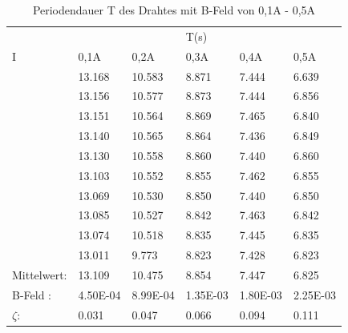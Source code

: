 \newpage
\begin{table}
    \centering
    \label{tab:tabelle_1}
    \begin{tabular}{p{3cm} | p{1.5cm} p{1.5cm} p{1.5cm} p{1.5cm} p{1.5cm}}
      &      &      & T(s) &      &     \\
    I & 0,1A & 0,2A & 0,3A & 0,4A & 0,5A\\
    \midrule
    & 13.168 & 10.583 & 8.871 &  7.444 &  6.639\\   
    & 13.156 & 10.577 & 8.873 &  7.444 &  6.856\\   
    & 13.151 & 10.564 & 8.869 &  7.465 &  6.840\\   
    & 13.140 & 10.565 & 8.864 &  7.436 &  6.849\\   
    & 13.130 & 10.558 & 8.860 &  7.440 &  6.860\\   
    & 13.103 & 10.552 & 8.855 &  7.462 &  6.855\\   
    & 13.069 & 10.530 & 8.850 &  7.440 &  6.850\\   
    & 13.085 & 10.527 & 8.842 & 7.463  &  6.842\\   
    & 13.074 & 10.518 & 8.835 &  7.445 &  6.835\\   
    & 13.011 & 9.773  & 8.823 &  7.428 &  6.823\\ 
    \midrule
    Mittelwert:    & 13.109 & 10.475 & 8.854 & 7.447 & 6.825 \\
    \midrule
    B-Feld : & 4.50E-04 & 8.99E-04 & 1.35E-03 & 1.80E-03 & 2.25E-03\\
    $\zeta$: & 0.031  & 0.047 & 0.066 & 0.094  & 0.111\\
    \bottomrule
    \end{tabular}
    \caption{Periodendauer T des Drahtes mit B-Feld von 0,1A - 0,5A}
    \label{tab:tabelle_01A}
\end{table}

